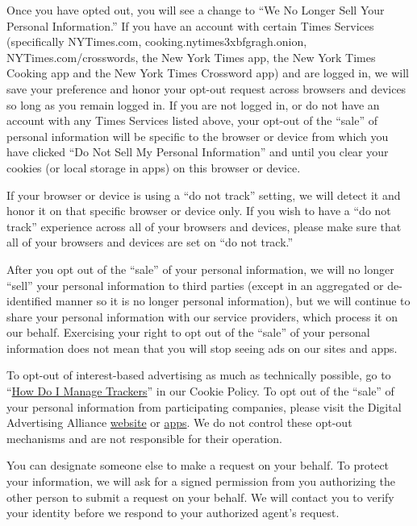 Once you have opted out, you will see a change to ``We No Longer Sell
Your Personal Information.'' If you have an account with certain Times
Services (specifically NYTimes.com, cooking.nytimes3xbfgragh.onion,
NYTimes.com/crosswords, the New York Times app, the New York Times
Cooking app and the New York Times Crossword app) and are logged in, we
will save your preference and honor your opt-out request across browsers
and devices so long as you remain logged in. If you are not logged in,
or do not have an account with any Times Services listed above, your
opt-out of the ``sale'' of personal information will be specific to the
browser or device from which you have clicked ``Do Not Sell My Personal
Information'' and until you clear your cookies (or local storage in
apps) on this browser or device.

If your browser or device is using a ``do not track'' setting, we will
detect it and honor it on that specific browser or device only. If you
wish to have a ``do not track'' experience across all of your browsers
and devices, please make sure that all of your browsers and devices are
set on ``do not track.''

After you opt out of the ``sale'' of your personal information, we will
no longer ``sell'' your personal information to third parties (except in
an aggregated or de-identified manner so it is no longer personal
information), but we will continue to share your personal information
with our service providers, which process it on our behalf. Exercising
your right to opt out of the ``sale'' of your personal information does
not mean that you will stop seeing ads on our sites and apps.

To opt-out of interest-based advertising as much as technically
possible, go to
``\href{http://www.nytimes3xbfgragh.onion/privacy/cookie-policy\#how-do-i-manage-trackers}{How
Do I Manage Trackers}'' in our Cookie Policy. To opt out of the ``sale''
of your personal information from participating companies, please visit
the Digital Advertising Alliance
\href{https://optout.privacyrights.info/?c=1}{website} or
\href{https://www.privacyrights.info/appchoices}{apps}. We do not
control these opt-out mechanisms and are not responsible for their
operation.

You can designate someone else to make a request on your behalf. To
protect your information, we will ask for a signed permission from you
authorizing the other person to submit a request on your behalf. We will
contact you to verify your identity before we respond to your authorized
agent's request.

